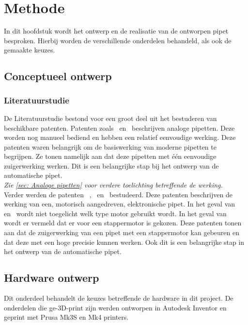 \chapter{Methode}
In dit hoofdstuk wordt het ontwerp en de realisatie van de ontworpen pipet besproken. Hierbij worden de verschillende onderdelen behandeld, als ook de gemaakte keuzes.

\section{Conceptueel ontwerp}
\subsection{Literatuurstudie}
De Literatuurstudie bestond voor een groot deel uit het bestuderen van beschikbare patenten. Patenten zoals\ \cite{RN16} en\ \cite{RN17} beschrijven analoge pipetten. Deze worden nog manueel bediend en hebben een relatief eenvoudige werking. Deze patenten waren belangrijk om de basiswerking van moderne pipetten te begrijpen. Ze tonen namelijk aan dat deze pipetten met één eenvoudige zuigerwerking werken. Dit is een belangrijke stap bij het ontwerp van de automatische pipet.
\\\textit{Zie \autoref{sec: Analoge pipetten} voor verdere toelichting betreffende de werking.}
\\[12pt]Verder werden de patenten \ \cite{RN35},\ \cite{RN36} en\ \cite{RN38} bestudeerd. Deze patenten beschrijven de werking van een, motorisch aangedreven, elektronische pipet. In het geval van\ \cite{RN36} en\ \cite{RN38} wordt niet toegelicht welk type motor gebruikt wordt. In het geval van\ \cite{RN35} wordt er vermeld dat er voor een stappermotor is gekozen. Deze patenten tonen aan dat de zuigerwerking van een pipet met een stappermotor kan gebeuren en dat deze met een hoge precisie kunnen werken. Ook dit is een belangrijke stap in het ontwerp van de automatische pipet.

\section{Hardware ontwerp}
Dit onderdeel behandelt de keuzes betreffende de hardware in dit project. De onderdelen die ge-3D-print zijn werden ontworpen in Autodesk Inventor en geprint met Prusa Mk3S en Mk4 printers.

